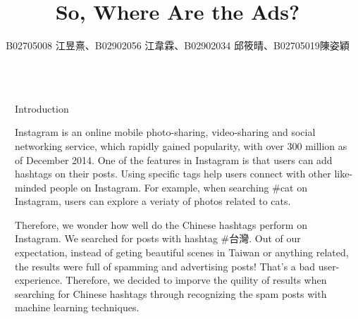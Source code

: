 \documentclass[final,hyperref={pdfpagelabels=false}]{beamer}
\title{\huge So, Where Are the Ads?} %
\author{B02705008 江昱熹、B02902056 江韋霖、B02902034 邱筱晴、B02705019陳姿穎} %
\institute{Computer Science and Information Engineering, National Taiwan University } %
\begin{document}

\begin{frame}[t] %

\begin{columns}[t] %

\begin{column}{.02\textwidth}\end{column} %

\begin{column}{.465\textwidth} %


            
\begin{block}{Introduction}

\par Instagram is an online mobile photo-sharing, video-sharing and social networking service, which rapidly gained popularity, with over 300 million as of December 2014. One of the features in Instagram is that users can add hashtags on their posts. Using specific tags help users connect with other like-minded people on Instagram. For example, when searching \#cat on Instagram, users can explore a veriaty of photos related to cats. 

\quad Therefore, we wonder how well do the Chinese hashtags perform on Instagram. We searched for posts with hashtag \#台灣. Out of our expectation, instead of geting beautiful scenes in Taiwan or anything related, the results were full of spamming and advertising posts! That’s a bad user-experience. Therefore, we decided to imporve the quility of results when searching for Chinese hashtags through recognizing the spam posts with machine learning techniques.
 

\end{block}
\end{column}
\end{columns}
\end{frame}
\end{document}
